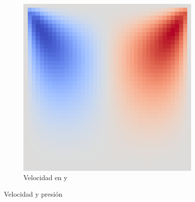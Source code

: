 \begin{figure}[!htbp]
\begin{subfigure}{.3\textwidth}
  \centering
  \includegraphics[width=.8\linewidth]{imagenes/small_v.png}
  \caption{Velocidad en y}
  \label{fig:sub2}
\end{subfigure}
\caption{Velocidad y presión}
\label{fig:run_1}
\end{figure}
